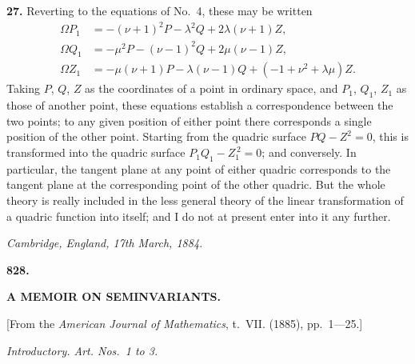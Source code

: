 \documentclass[11pt,a4paper]{book}
\begin{document}
\noindent\textbf{27.} Reverting to the equations of No.~4, these may be written
\begin{align*}
\Omega P_1 &= -(\nu+1)^2 P - \lambda^2 Q + 2\lambda(\nu+1)Z, \\
\Omega Q_1 &= -\mu^2 P - (\nu-1)^2 Q + 2\mu(\nu-1)Z, \\
\Omega Z_1 &= -\mu(\nu+1)P - \lambda(\nu-1)Q + (-1 + \nu^2 + \lambda\mu)Z.
\end{align*}
Taking $P$, $Q$, $Z$ as the coordinates of a point in ordinary space, and $P_1$, $Q_1$, $Z_1$ as those of another point, these equations establish a correspondence between the two points; to any given position of either point there corresponds a single position of the other point. Starting from the quadric surface $PQ - Z^2 = 0$, this is transformed into the quadric surface $P_1Q_1 - Z_1^{\,2} = 0$; and conversely. In particular, the tangent plane at any point of either quadric corresponds to the tangent plane at the corresponding point of the other quadric. But the whole theory is really included in the less general theory of the linear transformation of a quadric function into itself; and I do not at present enter into it any further.

\medskip
\begin{flushright}
\textit{Cambridge, England, 17th March, 1884.}
\end{flushright}

\vspace{1cm}


\newpage
\setcounter{page}{239}

\begin{center}
\Large\textbf{828.}

\bigskip

\Large\textbf{A MEMOIR ON SEMINVARIANTS.}
\end{center}

\begin{center}
[From the \textit{American Journal of Mathematics}, t.~VII. (1885), pp.~1---25.]
\end{center}

\begin{center}
\textit{Introductory. Art. Nos.~1 to 3.}
\end{center}
\end{document}
